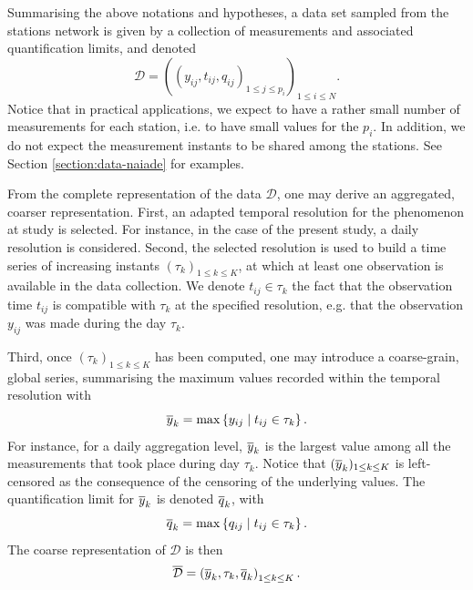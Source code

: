 Summarising the above notations and hypotheses, a data set sampled from the stations network is given by a collection of measurements and associated quantification limits, and denoted
\begin{equation*}
 \mathcal{D}=\left(\left(y_{ij},t_{ij}, q_{ij}\right)_{1\leq j\leq p_i}\right)_{1\leq i\leq N}.   
\end{equation*}
Notice that in practical applications, we expect to have a rather small number of measurements for each station, i.e. to have small values for the $p_i$. In addition, we do not expect the measurement instants to be shared among the stations. See Section \ref{section:data-naiade} for examples. 


From the complete representation of the data $\mathcal{D}$, one may derive an aggregated, coarser representation. First, an adapted temporal resolution for the phenomenon at study is selected. For instance, in the case of the present study, a daily resolution is considered. Second, the selected resolution is used to build a time series of increasing instants $(\tau_k)_{1\leq k\leq K}$, at which at least one observation is available in the data collection. We denote $t_{ij}\in\tau_k$ the fact that the observation time $t_{ij}$ is compatible with $\tau_k$ at the specified resolution, e.g. that the observation $y_{ij}$ was made during the day $\tau_k$. 

Third, once $(\tau_k)_{1\leq k\leq K}$ has been computed,  one may introduce a coarse-grain, global series, summarising the maximum values recorded within the temporal resolution with
\begin{equation}
\overline{y}_k=\max\left\{y_{ij} \mid t_{ij}\in\tau_k\right\}.
\end{equation}
For instance, for a daily aggregation level, $\overline{y}_k$ is the largest value among all the measurements that took place during day $\tau_k$. Notice that $(\overline{y}_k)_{1\leq k\leq K}$ is left-censored as the consequence of the censoring of the underlying values. The quantification limit for $\overline{y}_k$ is denoted $\overline{q}_k$, with
\begin{equation}
\overline{q}_k=\max\left\{q_{ij}\mid t_{ij}\in\tau_k\right\}.   
\end{equation}
The coarse representation of $\mathcal{D}$ is then
\begin{equation}
\overline{\mathcal{D}}=\left(\overline{y}_k, \tau_k, \overline{q}_k\right)_{1\leq k\leq K}.
\end{equation}


